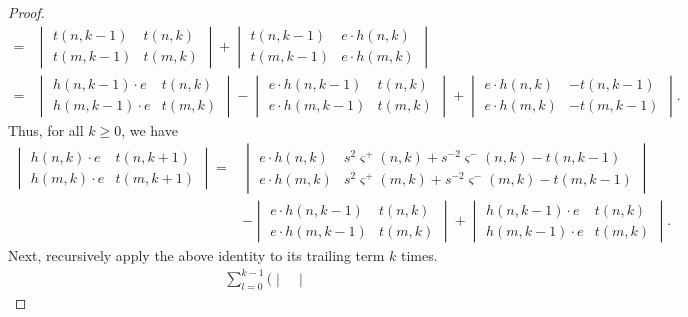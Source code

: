 \begin{proof}
\begin{align*}
=& 
\begin{vmatrix}
t(n, k-1) & t(n, k) \\
t(m, k-1) & t(m, k)
\end{vmatrix} 
+
\begin{vmatrix}
t(n, k-1) & e \cdot h(n, k) \\
t(m, k-1) & e \cdot h(m, k)
\end{vmatrix} \\
=&
\begin{vmatrix}
h(n, k-1) \cdot e & t(n, k) \\
h(m, k-1) \cdot e & t(m, k)
\end{vmatrix} 
- 
\begin{vmatrix}
e \cdot h(n, k-1) & t(n, k) \\
e \cdot h(m, k-1) & t(m, k)
\end{vmatrix}
+
\begin{vmatrix}
e \cdot h(n, k) & - t(n, k-1) \\
e \cdot h(m, k) & - t(m, k-1)
\end{vmatrix}.
\end{align*}
Thus, for all $k \geq 0$, we have
\begin{equation}\label{eq:detgymnastics5}
\begin{split}
\begin{vmatrix}
h(n, k) \cdot e & t(n, k+1) \\
h(m, k) \cdot e & t(m, k+1)
\end{vmatrix}
=&
\begin{vmatrix}
e \cdot h(n, k) & s^2 \varsigma^+ (n, k) + s^{-2} \varsigma^- (n, k) - t(n, k-1) \\
e \cdot h(m, k) & s^2 \varsigma^+ (m, k) + s^{-2} \varsigma^- (m, k) - t(m, k-1)
\end{vmatrix} \\
&-
\begin{vmatrix}
e \cdot h(n, k-1) & t(n, k) \\
e \cdot h(m, k-1) & t(m, k)
\end{vmatrix} 
+
\begin{vmatrix}
h(n, k-1) \cdot e & t(n, k) \\
h(m, k-1) \cdot e & t(m, k)
\end{vmatrix}.
\end{split}
\end{equation}
Next, recursively apply the above identity to its trailing term $k$ times.
\begin{align*}
&\sum_{l=0}^{k-1} \Bigg(
\begin{vmatrix}

\end{vmatrix}
\end{align*}
\end{proof}
